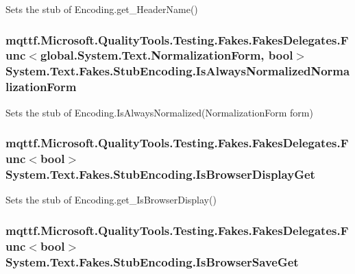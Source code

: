 Sets the stub of Encoding.\-get\-\_\-\-Header\-Name()

\hypertarget{class_system_1_1_text_1_1_fakes_1_1_stub_encoding_a90f0e1b4370bdcadac567b26aeb5bcaf}{
\subsubsection[{Is\-Always\-Normalized\-Normalization\-Form}]{\setlength{\rightskip}{0pt plus 5cm}mqttf.\-Microsoft.\-Quality\-Tools.\-Testing.\-Fakes.\-Fakes\-Delegates.\-Func$<$global.\-System.\-Text.\-Normalization\-Form, bool$>$ System.\-Text.\-Fakes.\-Stub\-Encoding.\-Is\-Always\-Normalized\-Normalization\-Form}}\label{class_system_1_1_text_1_1_fakes_1_1_stub_encoding_a90f0e1b4370bdcadac567b26aeb5bcaf}


Sets the stub of Encoding.\-Is\-Always\-Normalized(\-Normalization\-Form form)

\hypertarget{class_system_1_1_text_1_1_fakes_1_1_stub_encoding_aae85976aadb6c1f1c8333781575d7b39}{
\subsubsection[{Is\-Browser\-Display\-Get}]{\setlength{\rightskip}{0pt plus 5cm}mqttf.\-Microsoft.\-Quality\-Tools.\-Testing.\-Fakes.\-Fakes\-Delegates.\-Func$<$bool$>$ System.\-Text.\-Fakes.\-Stub\-Encoding.\-Is\-Browser\-Display\-Get}}\label{class_system_1_1_text_1_1_fakes_1_1_stub_encoding_aae85976aadb6c1f1c8333781575d7b39}


Sets the stub of Encoding.\-get\-\_\-\-Is\-Browser\-Display()

\hypertarget{class_system_1_1_text_1_1_fakes_1_1_stub_encoding_aa9e858bd947e46256eef32d3f43d25e6}{
\subsubsection[{Is\-Browser\-Save\-Get}]{\setlength{\rightskip}{0pt plus 5cm}mqttf.\-Microsoft.\-Quality\-Tools.\-Testing.\-Fakes.\-Fakes\-Delegates.\-Func$<$bool$>$ System.\-Text.\-Fakes.\-Stub\-Encoding.\-Is\-Browser\-Save\-Get}}\label{class_system_1_1_text_1_1_fakes_1_1_stub_encoding_aa9e858bd947e46256eef32d3f43d25e6}


